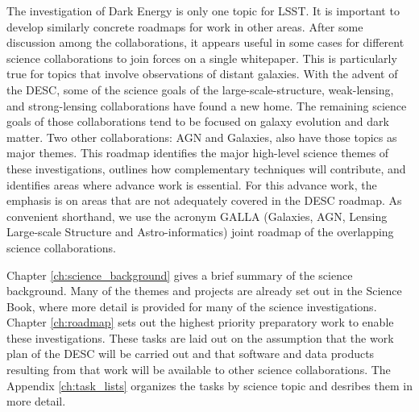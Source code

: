 The investigation of Dark Energy is only one topic for LSST. It is important to
develop similarly concrete roadmaps for work in other areas.  After some
discussion among the collaborations, it appears useful in some cases for
different science collaborations to join forces on a single whitepaper. This is
particularly true for topics that involve observations of distant galaxies. With
the advent of the DESC, some of the science goals of the large-scale-structure,
weak-lensing, and strong-lensing collaborations have found a new home. The
remaining science goals of those collaborations tend to be focused on galaxy
evolution and dark matter. Two other collaborations: AGN and Galaxies, also have
those topics as major themes. This roadmap identifies the major high-level
science themes of these investigations, outlines how complementary techniques
will contribute, and identifies areas where advance work is essential. For this
advance work, the emphasis is on areas that are not adequately covered in the
DESC roadmap. As convenient shorthand, we use the acronym GALLA (Galaxies, AGN, Lensing
Large-scale Structure and Astro-informatics) joint roadmap of the overlapping
science collaborations.

Chapter \ref{ch:science_background} gives a brief summary of the science background.
Many of the themes and projects are already set out in the Science Book, where more
detail is provided for many of the science investigations. Chapter \ref{ch:roadmap}
sets out the highest priority preparatory work to enable these investigations. These tasks
are laid out on the assumption that the work plan of the DESC will be carried out
and that software and data products resulting from that work will be available to 
other science collaborations. The Appendix \ref{ch:task_lists} organizes the tasks
by science topic and desribes them in more detail.

